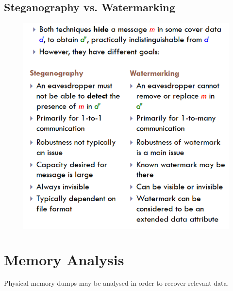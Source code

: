 \documentclass[10pt,a4paper]{report}
\begin{document}
\subsection{Steganography vs. Watermarking}
\begin{figure}[H]
\centering
\includegraphics[scale=0.5]{8.png}
\end{figure}
\section{Memory Analysis}
Physical memory dumps may be analysed in order to recover relevant data.
\end{document}
